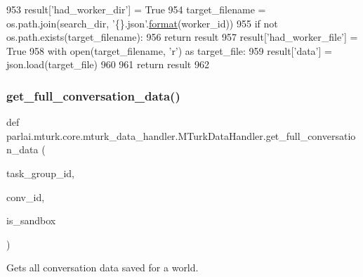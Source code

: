 \begin{DoxyCode}
953         result[\textcolor{stringliteral}{'had\_worker\_dir'}] = \textcolor{keyword}{True}
954         target\_filename = os.path.join(search\_dir, \textcolor{stringliteral}{'\{\}.json'}.\hyperlink{namespaceparlai_1_1chat__service_1_1services_1_1messenger_1_1shared__utils_a32e2e2022b824fbaf80c747160b52a76}{format}(worker\_id))
955         \textcolor{keywordflow}{if} \textcolor{keywordflow}{not} os.path.exists(target\_filename):
956             \textcolor{keywordflow}{return} result
957         result[\textcolor{stringliteral}{'had\_worker\_file'}] = \textcolor{keyword}{True}
958         with open(target\_filename, \textcolor{stringliteral}{'r') as target\_file:}
959 \textcolor{stringliteral}{            result['data'}] = json.load(target\_file)
960 
961         \textcolor{keywordflow}{return} result
962 
\end{DoxyCode}
\mbox{\label{classparlai_1_1mturk_1_1core_1_1mturk__data__handler_1_1MTurkDataHandler_aac3142a54b238e4d6b976ce657b5f7ac}} 
\subsubsection{\texorpdfstring{get\+\_\+full\+\_\+conversation\+\_\+data()}{get\_full\_conversation\_data()}}
{\footnotesize\ttfamily def parlai.\+mturk.\+core.\+mturk\+\_\+data\+\_\+handler.\+M\+Turk\+Data\+Handler.\+get\+\_\+full\+\_\+conversation\+\_\+data (\begin{DoxyParamCaption}\item[{}]{task\+\_\+group\+\_\+id,  }\item[{}]{conv\+\_\+id,  }\item[{}]{is\+\_\+sandbox }\end{DoxyParamCaption})\hspace{0.3cm}{\ttfamily [static]}}

\begin{DoxyVerb}Gets all conversation data saved for a world.
\end{DoxyVerb}
 

